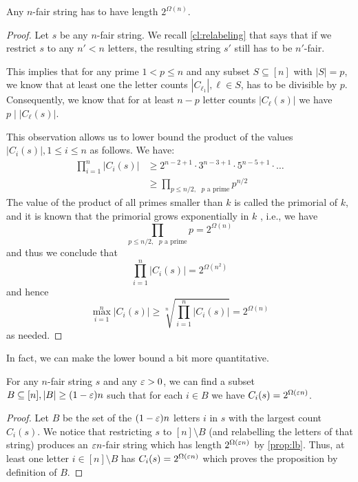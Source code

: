 \documentclass{article}
\begin{document}
\begin{lemma}
\label{prop:lb}
    Any $n$-fair string has to have length $2^{\Omega(n)}$. 
\end{lemma}
\begin{proof}
    Let $s$ be any $n$-fair string. We recall \cref{cl:relabeling} that says that if we restrict $s$ to any $n' < n$ letters, the resulting string $s'$ still has to be $n'$-fair. 
    
    This implies that for any prime $1 < p \le n$ and any subset $S \subseteq [n]$ with $|S| = p$, we know that at least one the letter counts $|C_{\ell_1}|, \ell \in S$, has to be divisible by $p$. Consequently, we know that for at least $n-p$ letter counts $|C_{\ell}(s)|$ we have $p \mid  |C_{\ell}(s)|$. 
    
    This observation allows us to lower bound the product of the values $|C_i(s)|, 1 \le i \le n$ as follows. We have:
    \begin{align}
    \prod_{i = 1}^n |C_i(s)| 
    &\ge 2^{n-2 + 1} \cdot 3^{n-3 + 1} \cdot 5^{n-5 + 1} \cdot \dots \\
    &\ge \prod_{ p \le n/2, \text{ $p$ a prime}}
    p^{n/2}
    \end{align}
    The value of the product of all primes smaller than $k$ is called the primorial of $k$, and it is known that the primorial grows exponentially in $k$ \cite{finch2003mathematical}, i.e., we have 
    \[
    \prod_{ p \le n/2, \text{ $p$ a prime}} p = 2^{\Omega(n)}
    \]
    and thus we conclude that
    \[
    \prod_{i = 1}^n |C_i(s)| = 2^{\Omega(n^2)}
    \]
    and hence
    \[
    \max_{i = 1}^n |C_i(s)|
    \ge \sqrt[n]{
    \prod_{i = 1}^n |C_i(s)| 
    }
    = 2^{\Omega(n)}
    \]
    as needed. 
    
\end{proof}

In fact, we can make the lower bound a bit more quantitative. 
\begin{theorem}
\label{prop:lb2}
    For any $n$-fair string $s$ and any $\varepsilon > 0$, we can find a subset $B \subseteq [n], |B| \ge (1-\varepsilon) n$ such that for each $i \in B$ we have $C_i(s) = 2^{\Omega(\varepsilon n)}$.     
\end{theorem}
\begin{proof}
    Let $B$ be the set of the $(1- \varepsilon) n$ letters $i$ in $s$ with the largest count $C_i(s)$. We notice that restricting $s$ to $[n] \setminus B$ (and relabelling the letters of that string) produces an $\varepsilon n$-fair string which has length $2^{\Omega(\varepsilon n)}$ by \cref{prop:lb}. Thus, at least one letter $i \in [n] \setminus B$ has $C_i(s) = 2^{\Omega(\varepsilon n)}$ which proves the proposition by definition of $B$. 
\end{proof}
\end{document}
